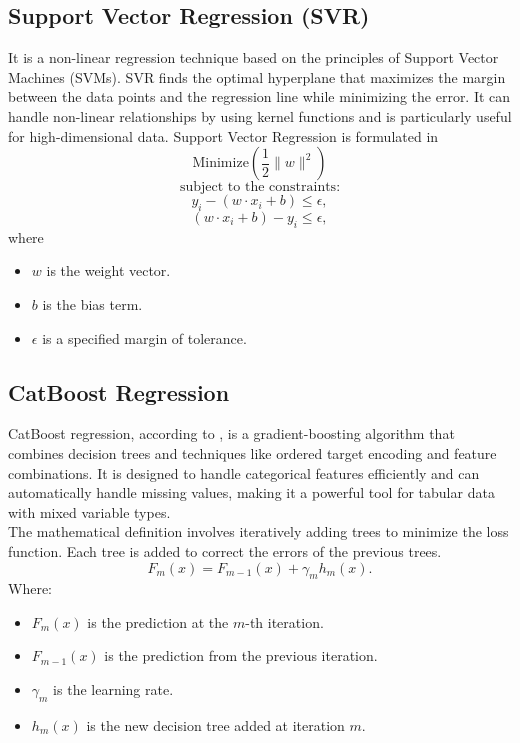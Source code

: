 \documentclass{book}
\numberwithin{equation}{section}
\numberwithin{figure}{section}
\begin{document}
\subsection{Support Vector Regression (SVR)}
\label{svr}
\vspace{-5mm} %
It is a non-linear regression technique based on the principles of Support Vector Machines (SVMs). SVR finds the optimal hyperplane that maximizes the margin between the data points and the regression line while minimizing the error. It can handle non-linear relationships by using kernel functions and is particularly useful for high-dimensional data. Support Vector Regression is formulated in \cite{svr}
\begin{equation}
\text{Minimize} \left( \frac{1}{2} \|w\|^2 \right)
\end{equation}
\[
\text{subject to the constraints:}
\]
\begin{equation}
y_i - (w \cdot x_i + b) \leq \epsilon,
\end{equation}
\begin{equation}
(w \cdot x_i + b) - y_i \leq \epsilon,
\end{equation}
where

\begin{itemize}
    \item $w$ is the weight vector.
    \item $b$ is the bias term.
    \item $\epsilon$ is a specified margin of tolerance.
\end{itemize}
\vspace{-5mm} %
\subsection{CatBoost Regression}
\label{cbr}
\vspace{-5mm} %
CatBoost regression, according to \cite{catboost}, is a gradient-boosting algorithm that combines decision trees and techniques like ordered target encoding and feature combinations. It is designed to handle categorical features efficiently and can automatically handle missing values, making it a powerful tool for tabular data with mixed variable types.\\
The mathematical definition involves iteratively adding trees to minimize the loss function. Each tree is added to correct the errors of the previous trees.
\begin{equation}
F_{m}(x) = F_{m-1}(x) + \gamma_m h_m(x).
\end{equation}
Where:
\begin{itemize}
    \item $F_{m}(x)$ is the prediction at the $m$-th iteration.
    \item $F_{m-1}(x)$ is the prediction from the previous iteration.
    \item $\gamma_m$ is the learning rate.
    \item $h_m(x)$ is the new decision tree added at iteration $m$.
\end{itemize}
\end{document}
